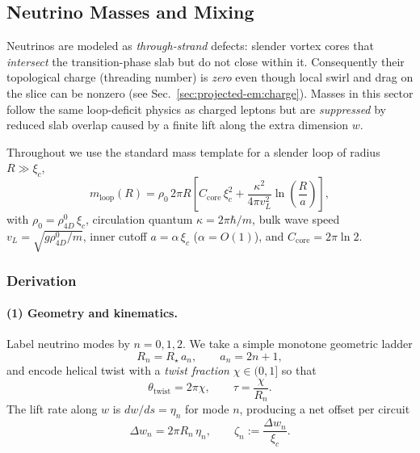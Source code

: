\subsection{Neutrino Masses and Mixing}

Neutrinos are modeled as \emph{through-strand} defects: slender vortex cores that \emph{intersect} the transition-phase slab but do not close within it. Consequently their topological charge (threading number) is \emph{zero} even though local swirl and drag on the slice can be nonzero (see Sec.~\ref{sec:projected-em:charge}). Masses in this sector follow the same loop-deficit physics as charged leptons but are \emph{suppressed} by reduced slab overlap caused by a finite lift along the extra dimension $w$.

Throughout we use the standard mass template for a slender loop of radius $R\gg \xi_c$,
\begin{equation}
\label{eq:nu:mass-template}
m_{\text{loop}}(R)
=\rho_0\,2\pi R\left[
C_{\mathrm{core}}\,\xi_c^2
+\frac{\kappa^2}{4\pi v_L^2}\ln\!\left(\frac{R}{a}\right)\right],
\end{equation}
with $\rho_0=\rho_{4D}^0\,\xi_c$, circulation quantum $\kappa=2\pi\hbar/m$, bulk wave speed $v_L=\sqrt{g\rho_{4D}^0/m}$, inner cutoff $a=\alpha\,\xi_c$ ($\alpha=O(1)$), and $C_{\mathrm{core}}=2\pi\ln 2$.

\subsubsection{Derivation}

\paragraph{(1) Geometry and kinematics.}
Label neutrino modes by $n=0,1,2$. We take a simple monotone geometric ladder
\begin{equation}
R_n=R_\star\,a_n,\qquad a_n=2n+1,
\end{equation}
and encode helical twist with a \emph{twist fraction} $\chi\in(0,1]$ so that
\begin{equation}
\theta_{\mathrm{twist}}=2\pi\chi,\qquad \tau=\frac{\chi}{R_n}.
\end{equation}
The lift rate along $w$ is $dw/ds=\eta_n$ for mode $n$, producing a net offset per circuit
\begin{equation}
\Delta w_n=2\pi R_n\,\eta_n,\qquad 
\zeta_n:=\frac{\Delta w_n}{\xi_c}.
\end{equation}


